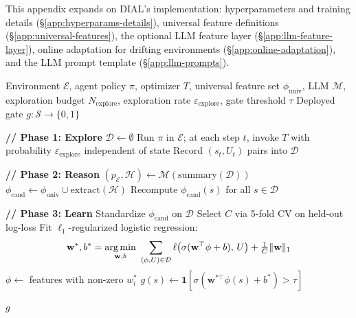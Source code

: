 This appendix expands on DIAL's implementation: hyperparameters
and training details (\S\ref{app:hyperparams-details}), universal
feature definitions (\S\ref{app:universal-features}), the optional
LLM feature layer (\S\ref{app:llm-feature-layer}), online
adaptation for drifting environments (\S\ref{app:online-adaptation}),
and the LLM prompt template (\S\ref{app:llm-prompts}).

\begin{algorithm}[h]
	\caption{DIAL: Direction-Informed Adaptive Learning}
	\label{alg:dial}
	\small
	\begin{algorithmic}[1]
		\Require Environment $\mathcal{E}$, agent policy $\pi$, optimizer
		$T$, universal feature set $\phi_{\text{univ}}$, LLM
		$\mathcal{M}$, exploration budget $N_{\text{explore}}$,
		exploration rate $\varepsilon_{\text{explore}}$,
		gate threshold $\tau$
		\Ensure Deployed gate $g: \mathcal{S} \to \{0, 1\}$

		\Statex \textbf{// Phase 1: Explore}
		\State $\mathcal{D} \gets \emptyset$
		  \State Run $\pi$ in $\mathcal{E}$; at each step $t$, invoke $T$
		  with probability $\varepsilon_{\text{explore}}$
		  independent of state
		  \State Record $(s_t, U_t)$ pairs into $\mathcal{D}$
		\EndFor

		\Statex \textbf{// Phase 2: Reason}
		\State $(p_{\mathcal{E}}, \mathcal{H}) \gets
		\mathcal{M}(\mathrm{summary}(\mathcal{D}))$
		\State $\phi_{\text{cand}} \gets \phi_{\text{univ}} \cup
		\mathrm{extract}(\mathcal{H})$
		\State Recompute $\phi_{\text{cand}}(s)$ for all
		$s \in \mathcal{D}$

		\Statex \textbf{// Phase 3: Learn}
		\State Standardize $\phi_{\text{cand}}$ on $\mathcal{D}$
		\State Select $C$ via 5-fold CV on held-out log-loss
		\State Fit $\ell_1$-regularized logistic regression:
		\begin{equation}
		\mathbf{w}^*, b^* = \operatorname*{arg\,min}_{\mathbf{w}, b}\
		\sum_{(\phi, U) \in \mathcal{D}}
		\ell\bigl(\sigma(\mathbf{w}^\top \phi + b),\, U\bigr)
		+ \tfrac{1}{C} \|\mathbf{w}\|_1
		\label{eq:lasso-full}
		\end{equation}
		\State $\phi \gets$ features with non-zero $w_i^*$
		\State $g(s) \gets
		\mathbf{1}[\sigma(\mathbf{w}^{*\top} \phi(s) + b^*) > \tau]$

		\State \Return $g$
	\end{algorithmic}
\end{algorithm}

